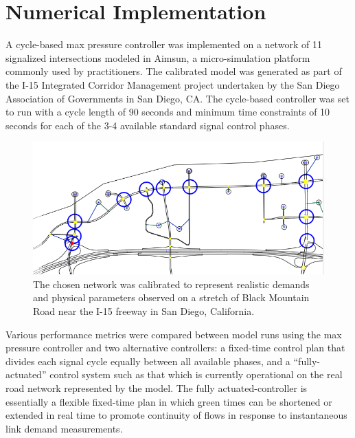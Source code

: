 \section{Numerical Implementation}
A cycle-based max pressure controller was implemented on a network of 11 signalized intersections modeled in Aimsun, a micro-simulation platform commonly used by practitioners. The calibrated model was generated as part of the I-15 Integrated Corridor Management project undertaken by the San Diego Association of Governments in San Diego, CA. 
The cycle-based controller was set to run with a cycle length of 90 seconds and minimum time constraints of 10 seconds for each of the 3-4 available standard signal control phases.  
\begin{figure}[h!]
\vspace{-1em}
\centering
\includegraphics[width=.8\columnwidth]{./i15network.png}
\caption{The chosen network was calibrated to represent realistic demands and physical parameters observed on a stretch of Black Mountain Road near the I-15 freeway in San Diego, California.}
\vspace{-1em}
\end{figure}
%
Various performance metrics were compared between model runs using the max pressure controller and two alternative controllers: a fixed-time control plan that divides each signal cycle equally between all available phases, and a ``fully-actuated'' control system such as that which is currently operational on the real road network represented by the model. The fully actuated-controller is essentially a flexible fixed-time plan in which green times can be shortened or extended in real time to promote continuity of flows in response to instantaneous link demand measurements. 
